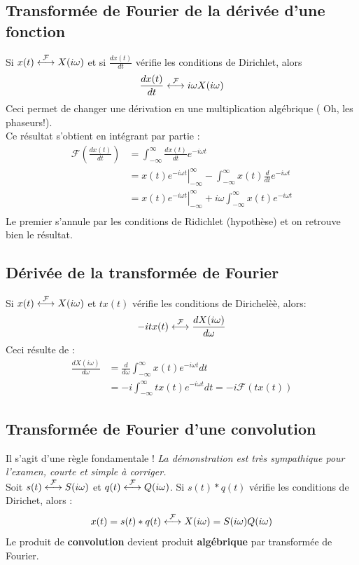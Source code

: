 	\subsection{Transformée de Fourier de la dérivée d'une fonction}
	Si $x(t) \ft X(i\omega)$ et si $\frac{dx(t)}{dt}$ vérifie les conditions
	de Dirichlet, alors
	\begin{equation}
	\frac{dx(t)}{dt} \ft i\omega X(i\omega)
	\end{equation}
	Ceci permet de changer une dérivation en une multiplication algébrique (
	Oh, les phaseurs!).\\
	Ce résultat s'obtient en intégrant par partie :
	\begin{equation}
	\begin{array}{ll}
	\mathcal{F}\left(\frac{dx(t)}{dt}\right) &= \int_{-\infty}^\infty \frac{dx(t)}
	{dt}e^{-i\omega t}\\
	 &= \left.x(t)e^{-i\omega t}\right|_{-\infty}^\infty - \int_{-\infty}^\infty x(t)
	 \frac{d}{dt}e^{-i\omega t}\\
	 &= \left.x(t)e^{-i\omega t}\right|_{-\infty}^\infty +i\omega \int_{-\infty}^
	 \infty x(t)e^{-i\omega t}\\
	\end{array}
	\end{equation}
	Le premier s'annule par les conditions de Ridichlet (hypothèse) et on retrouve 
	bien le résultat.
		
	\subsection{Dérivée de la transformée de Fourier}
	Si $x(t) \ft X(i\omega)$ et $tx(t)$ vérifie les conditions de Dirichelèè,
	alors:
	\begin{equation}
	-itx(t) \ft \frac{dX(i\omega)}{d\omega}
	\end{equation}
	Ceci résulte de :
	\begin{equation}
	\begin{array}{ll}
	\frac{dX(i\omega)}{d\omega} &= \frac{d}{d\omega}\int_{-\infty}^\infty 
	x(t)e^{-i\omega t}dt\\
	 &= -i \int_{-\infty}^\infty tx(t)e^{-i\omega t}dt = -i\mathcal{F}(tx(t))
	\end{array}
	\end{equation}



	\subsection{Transformée de Fourier d'une convolution}
	Il s'agit d'une règle fondamentale ! \textit{La démonstration est très sympathique
	pour l'examen, courte et simple à corriger.}\\
	Soit $s(t) \ft S(i\omega)$ et $q(t) \ft Q(i\omega)$. Si $s(t)*q(t)$ vérifie les 
	conditions de Dirichet, alors :
	\begin{equation}
	x(t) = s(t)*q(t) \ft X(i\omega) = S(i\omega)Q(i\omega)
	\label{eq:TransfoConvol}
	\end{equation}
	Le produit de \textbf{convolution} devient produit \textbf{algébrique} par transformée 
	de Fourier.
	
